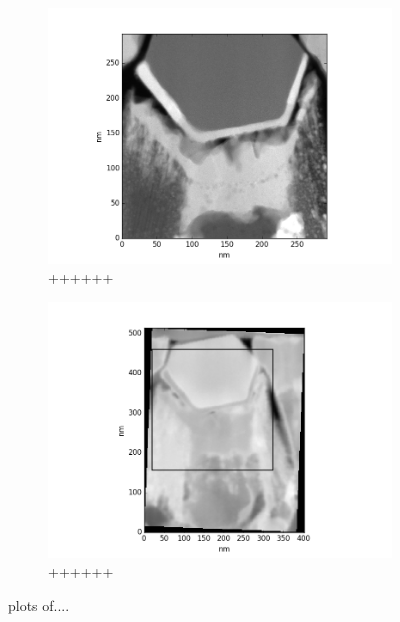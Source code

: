 \begin{figure}
\begin{subfigure}{.5\textwidth}
	\centering
	\includegraphics[width=\linewidth]{fig/in-rectange}
	\caption{++++++}
	\label{fig:edx-in-sped-edx}
\end{subfigure}%
\begin{subfigure}{.5\textwidth}
	\centering
	\includegraphics[width=\linewidth]{fig/sdrot-with-rectange}
	\caption{++++++}
	\label{fig:edx-in-sped-rectangle}
\end{subfigure}
\caption{plots of....}
\label{fig:edx-in-sped}
\end{figure}


